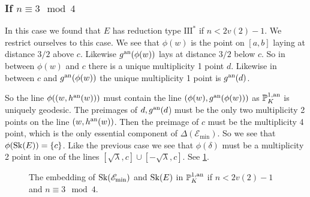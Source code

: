 \subsubsection{If $n \equiv 3 \mod 4$ } \label{sec:if_n_equiv_3_mod_4}
In this case we found that $E$ has reduction type $\mathrm{III}^*$ if $n < 2v(2) -1$. 
We restrict ourselves to this case. 
We see that $\phi(w)$ is the point on $[a, b]$ laying at distance $3 /2$ above $c$. 
Likewise  $g\an(\phi(w))$ lays at distance $3/ 2$ below $c$. 
So in between $\phi(w)$ and $c$ there is a unique multiplicity 1 point $d$. 
Likewise in between $c$ and $g\an(\phi(w))$ the unique multiplicity 1 point is $g{}^{\text{an}}(d)$. 

So the line $\phi((w, h\an(w)))$ must contain the line $(\phi(w), g\an(\phi(w)))$ as  $\mathbb{P}^{1, \text{an}}_K$ is uniquely geodesic. 
The preimages of $d, g{}^{\text{an}} (d$) must be the only two multiplicity 2 points on the line $(w, h{}^{\text{an}}(w))$. 
Then the preimage of $c$ must be the multiplicity 4 point, which is the only essential component of $\Delta(\mathscr E_\text{min} )$. 
So we see that $\phi(\sk(E)) = \{c\} $. 
Like the previous case we see that $\phi(\delta)$ must be a multiplicity 2 point in one of the lines $[\sqrt{\lambda} , c] \cup [-\sqrt{\lambda} , c]$. 
See \cref{fig:type_iiis_to_sk_p}.
\begin{figure}[ht]
    \centering
    \caption{The embedding of $\operatorname{Sk}(\mathscr E_\text{min}) $ and $\operatorname{Sk}(E)$ in $\mathbb{P}^{1, \text{an}}_K$ if $n < 2v(2)-1$ and $n \equiv 3 \mod 4 $.}
    \label{fig:type_iiis_to_sk_p}
\end{figure}



